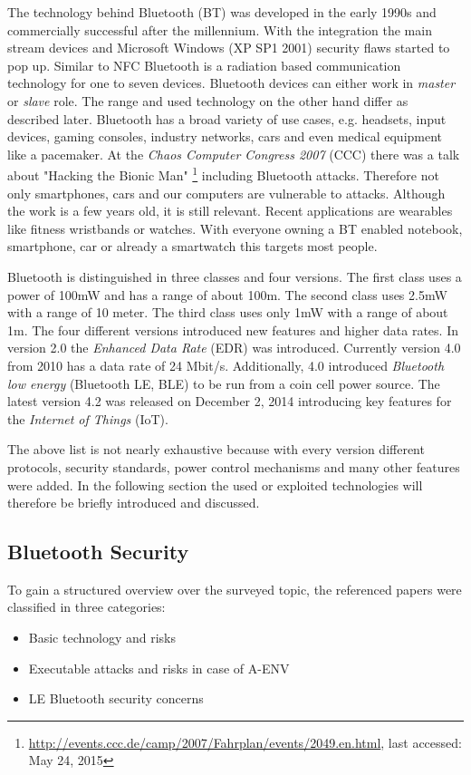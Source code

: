 \documentclass[12pt,a4paper]{article}
\begin{document}
The technology behind Bluetooth (BT) was developed in the early 1990s and commercially successful after the millennium. With the integration  the main stream devices and Microsoft Windows (XP SP1 2001) security flaws started to pop up. Similar to NFC Bluetooth is a radiation based communication technology for one to seven devices. Bluetooth devices can either work in \emph{master} or \emph{slave} role. The range and used technology on the other hand differ as described later. 
Bluetooth has a broad variety of use cases, e.g. headsets, input devices, gaming consoles, industry networks, cars and even medical equipment like a pacemaker. At the \emph{Chaos Computer Congress 2007} (CCC) there was a talk about "Hacking the Bionic Man" \footnote{\url{http://events.ccc.de/camp/2007/Fahrplan/events/2049.en.html}, last accessed: May 24, 2015} including Bluetooth attacks. Therefore not only smartphones, cars and our computers are vulnerable to attacks.
Although the work is a few years old, it is still relevant. Recent applications are wearables like fitness wristbands or watches. With everyone owning a BT enabled notebook, smartphone, car or already a smartwatch this targets most people.

Bluetooth is distinguished in three classes and four versions. The first class uses a power of 100mW and has a range of about 100m. The second class uses 2.5mW with a range of 10 meter. The third class uses only 1mW with a range of about 1m.
The four different versions introduced new features and higher data rates. In version 2.0 the \emph{Enhanced Data Rate} (EDR) was introduced. Currently version 4.0 from 2010 has a data rate of 24 Mbit/s. Additionally, 4.0 introduced \emph{Bluetooth low energy} (Bluetooth LE, BLE) to be run from a coin cell power source. The latest version 4.2 was released on December 2, 2014 introducing key features for the \emph{Internet of Things} (IoT).

The above list is not nearly exhaustive because with every version different protocols, security standards, power control mechanisms and many other features were added. In the following section the used or exploited technologies will therefore be briefly introduced and discussed.

\subsection{Bluetooth Security}
To gain a structured overview over the surveyed topic, the referenced papers were classified in three categories: 
\begin{itemize}
	\item Basic technology and risks
	\item Executable attacks and risks in case of A-ENV
	\item LE Bluetooth security concerns
\end{itemize}
\end{document}
